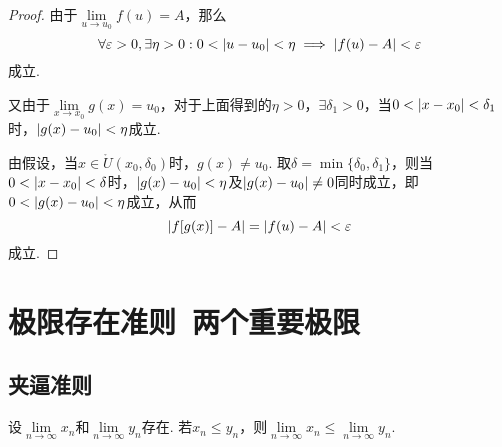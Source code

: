 \begin{theorem}
\begin{proof}
由于\(\lim\limits_{u \to u_0} f(u) = A\)，那么\[
\forall\varepsilon>0, \exists\eta>0 :
0 < \abs{u - u_0} < \eta
\implies
\abs{ f(u) - A } < \varepsilon
\]成立.

又由于\(\lim\limits_{x \to x_0} g(x) = u_0\)，对于上面得到的\(\eta > 0\)，\(\exists \delta_1 > 0\)，当\(0 < \abs{x - x_0} < \delta_1\)时，\(\abs{ g(x) - u_0 } < \eta\)成立.

由假设，当\(x \in \mathring{U}(x_0,\delta_0)\)时，\(g(x) \neq u_0\).
取\(\delta = \min\{\delta_0,\delta_1\}\)，则当\(0 < \abs{x - x_0} < \delta\)时，\(\abs{ g(x) - u_0 } < \eta\)及\(\abs{ g(x) - u_0 } \neq 0\)同时成立，即\(0 < \abs{ g(x) - u_0 } < \eta\)成立，从而\[
\abs{ f[g(x)] - A } = \abs{ f(u) - A } < \varepsilon
\]成立.
\end{proof}
\end{theorem}

\section{极限存在准则\ 两个重要极限}
\subsection{夹逼准则}
\begin{lemma}
设\(\lim\limits_{n\to\infty} x_n\)和\(\lim\limits_{n\to\infty} y_n\)存在.
若\(x_n \leq y_n\)，则\(\lim\limits_{n\to\infty} x_n \leq \lim\limits_{n\to\infty} y_n\).
\end{lemma}

